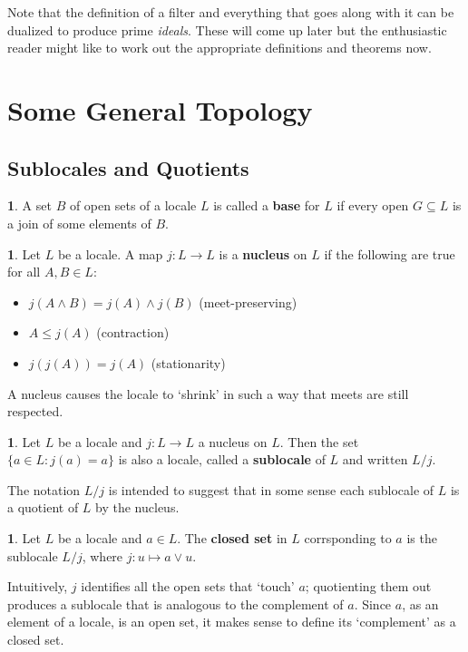 \documentclass[oneside,english]{amsbook}
\numberwithin{section}{chapter}
\theoremstyle{plain}
\theoremstyle{definition}
\newtheorem{defn}[thm]{\protect\definitionname}
\providecommand{\definitionname}{Definition}
\begin{document}
Note that the definition of a filter and everything that goes along with it can be dualized to produce prime \emph{ideals}. These will come up later but the enthusiastic reader might like to work out the appropriate definitions and theorems now.

\section{Some General Topology}

\subsection{Sublocales and Quotients}

\begin{defn}
	A set $B$ of open sets of a locale $L$ is called a \textbf{base} for $L$ if every open $G\subseteq L$ is a join of some elements of $B$.
\end{defn}

\begin{defn}
	Let $L$ be a locale. A map $j:L\to L$ is a \textbf{nucleus} on $L$ if the following are true for all $A, B\in L$:
	\begin{itemize}
		\item {$j(A\land B) = j(A)\land j(B)$ (meet-preserving)}
		\item {$A\le j(A)$ (contraction)}
		\item{$j(j(A))= j(A)$ (stationarity)}
	\end{itemize}
\end{defn}

A nucleus causes the locale to `shrink' in such a way that meets are still respected. 

\begin{defn}
	Let $L$ be a locale and $j:L\to L$ a nucleus on $L$. Then the set $\{a\in L: j(a) = a\}$ is also a locale, called a \textbf{sublocale} of $L$ and written $L/j$.
\end{defn}

The notation $L/j$ is intended to suggest that in some sense each sublocale of $L$ is a quotient of $L$ by the nucleus.

\begin{defn}
	Let $L$ be a locale and $a\in L$. The \textbf{closed set} in $L$ corrsponding to $a$ is the sublocale $L/j$, where $j: u\mapsto a\lor u$. 
\end{defn}

Intuitively, $j$ identifies all the open sets that `touch' $a$; quotienting them out produces a sublocale that is analogous to the complement of $a$. Since $a$, as an element of a locale, is an open set, it makes sense to define its `complement' as a closed set.
\end{document}
